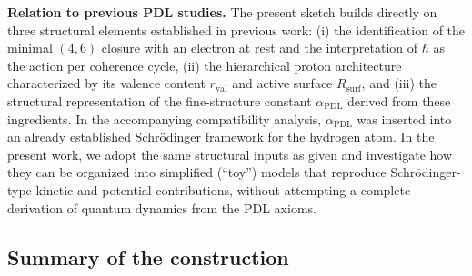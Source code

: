 \documentclass[11pt,a4paper]{article}
\begin{document}
\noindent\textbf{Relation to previous PDL studies.}
The present sketch builds directly on three structural elements established in previous work: (i) the identification of the minimal $(4,6)$ closure with an electron at rest and the interpretation of $\hbar$ as the action per coherence cycle, (ii) the hierarchical proton architecture characterized by its valence content $r_{\mathrm{val}}$ and active surface $R_{\mathrm{surf}}$, and (iii) the structural representation of the fine-structure constant $\alpha_{\mathrm{PDL}}$ derived from these ingredients. In the accompanying compatibility analysis, $\alpha_{\mathrm{PDL}}$ was inserted into an already established Schr\"odinger framework for the hydrogen atom. In the present work, we adopt the same structural inputs as given and investigate how they can be organized into simplified (“toy”) models that reproduce Schr\"odinger-type kinetic and potential contributions, without attempting a complete derivation of quantum dynamics from the PDL axioms.
\subsection{Summary of the construction}
\end{document}
